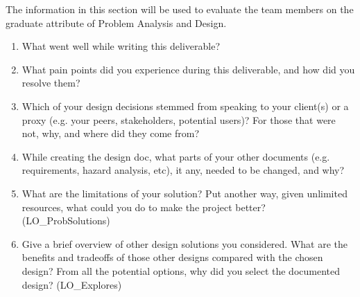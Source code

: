 \documentclass[12pt, titlepage]{article}
\begin{document}

The information in this section will be used to evaluate the team members on the
graduate attribute of Problem Analysis and Design.



\begin{enumerate}
  \item What went well while writing this deliverable? 
  \item What pain points did you experience during this deliverable, and how
    did you resolve them?
  \item Which of your design decisions stemmed from speaking to your client(s)
  or a proxy (e.g. your peers, stakeholders, potential users)? For those that
  were not, why, and where did they come from?
  \item While creating the design doc, what parts of your other documents (e.g.
  requirements, hazard analysis, etc), it any, needed to be changed, and why?
  \item What are the limitations of your solution?  Put another way, given
  unlimited resources, what could you do to make the project better? (LO\_ProbSolutions)
  \item Give a brief overview of other design solutions you considered.  What
  are the benefits and tradeoffs of those other designs compared with the chosen
  design?  From all the potential options, why did you select the documented design?
  (LO\_Explores)
\end{enumerate}
\end{document}
